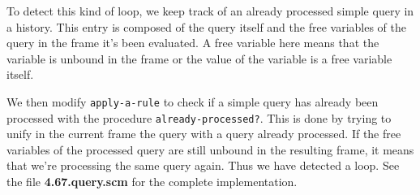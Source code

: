 \documentclass[a4paper,12pt]{article}
\begin{document}
To detect this kind of loop, we keep track of an already processed
simple query in a history.  This entry is composed of the query
itself and the free variables of the query in the frame it's been
evaluated.  A free variable here means that the variable is unbound in
the frame or the value of the variable is a free variable itself.

We then modify \lstinline!apply-a-rule! to check if a simple query has
already been processed with the procedure
\lstinline!already-processed?!.  This is done by trying to unify in
the current frame the query with a query already processed.  If the
free variables of the processed query are still unbound in the
resulting frame, it means that we're processing the same query again.
Thus we have detected a loop.  See the file \textbf{4.67.query.scm}
for the complete implementation.
\end{document}
